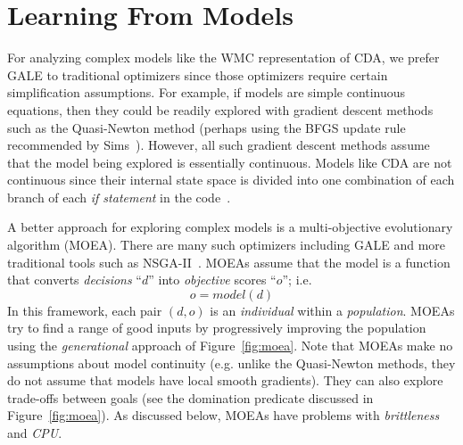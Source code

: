 \documentclass[journal]{IEEEtran}
\newcommand{\fig}[1]{Figure~\ref{fig:#1}}
\begin{document}




\section{Learning From Models}\label{sec:lfm}


For analyzing complex models like the WMC representation of CDA, we prefer GALE to traditional  optimizers since those optimizers require certain simplification assumptions.
For example, if models are simple continuous equations, then they could be readily explored with gradient descent methods such as the Quasi-Newton method (perhaps using the BFGS update rule recommended by Sims~\cite{Sims10}).
However, all such gradient descent methods assume that the model being explored is essentially continuous. 
Models like CDA are not continuous since their internal state space is divided into one combination of each branch of each {\em if statement} in the code~\cite{Davies2012}.



A better approach for exploring complex models is a multi-objective evolutionary algorithm (MOEA). 
There are many such optimizers including GALE and more traditional tools such as NSGA-II~\cite{deb00afast}.
MOEAs assume that the model is a function that converts  {\em decisions} ``$d$'' into {\em objective} scores ``$o$''; i.e.
\[
o = \mathit{model}(d)
\]
In this framework, each pair $(d,o)$ is an {\em individual} within a {\em population}. 
MOEAs try to find a range of good inputs by progressively improving the population using the {\em generational} approach of  \fig{moea}.
Note that MOEAs  make no assumptions about model continuity (e.g. unlike the Quasi-Newton methods, they do not assume that models have local smooth gradients). 
They can also explore trade-offs between goals (see the domination predicate discussed in \fig{moea}). 
As discussed below, MOEAs have problems with {\em brittleness} and {\em CPU}.
\end{document}
